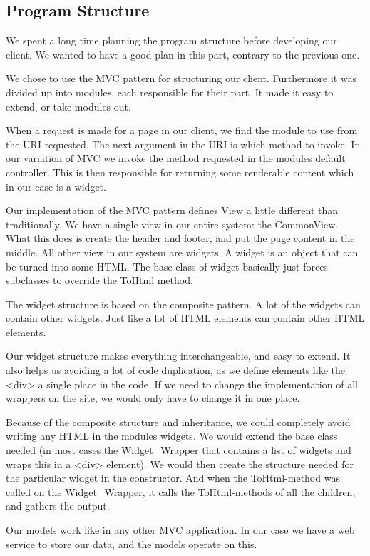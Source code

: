 \subsection{Program Structure}
We spent a long time planning the program structure before developing our client. We wanted to have a good plan in this part, contrary to the previous one.

We chose to use the MVC pattern for structuring our client. Furthermore it was divided up into modules, each responsible for their part. It made it easy to extend, or take modules out.

When a request is made for a page in our client, we find the module to use from the URI requested. The next argument in the URI is which method to invoke. In our variation of MVC we invoke the method requested in the modules default controller. This is then responsible for returning some renderable content which in our case is a widget.

Our implementation of the MVC pattern defines View a little different than traditionally. We have a single view in our entire system: the CommonView. What this does is create the header and footer, and put the page content in the middle. All other view in our system are widgets. A widget is an object that can be turned into some HTML. The base class of widget basically just forces subclasses to override the ToHtml method.

The widget structure is based on the composite pattern. A lot of the widgets can contain other widgets. Just like a lot of HTML elements can contain other HTML elements.

Our widget structure makes everything interchangeable, and easy to extend. It also helps us avoiding a lot of code duplication, as we define elements like the <div> a single place in the code. If we need to change the implementation of all wrappers on the site, we would only have to change it in one place.

Because of the composite structure and inheritance, we could completely avoid writing any HTML in the modules widgets. We would extend the base class needed (in most cases the Widget\_Wrapper that contains a list of widgets and wraps this in a <div> element). We would then create the structure needed for the particular widget in the constructor. And when the ToHtml-method was called on the Widget\_Wrapper, it calls the ToHtml-methods of all the children, and gathers the output. 

Our models work like in any other MVC application. In our case we have a web service to store our data, and the models operate on this.
	\newpage